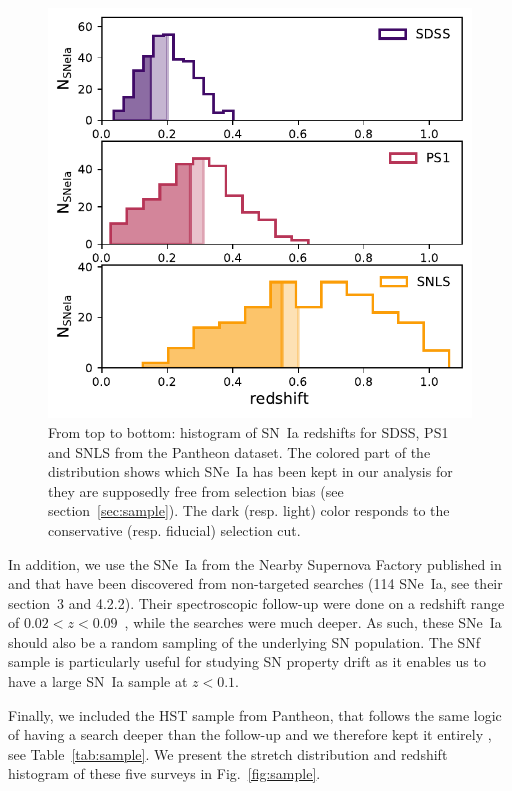 \documentclass[]{aa} %
\newcommand{\nn}[1]{{\textcolor[rgb]{1, 0.27, 0}{#1}}}
\begin{document}
\begin{figure}
    \centering
    \includegraphics[width=0.95\linewidth]{Article_figures/hist_surveys_cuts_55-inferno.pdf}
    \caption{From top to bottom: histogram of SN~Ia redshifts for SDSS, PS1 and
    SNLS from the Pantheon dataset. The colored part of the
distribution shows which SNe~Ia has been kept in our analysis for they are
supposedly free from selection bias (see section~\ref{sec:sample}). The
dark (resp. light) color responds to the conservative (resp. fiducial) selection cut.}
    \label{fig:cuts}
\end{figure}

In addition, we use the SNe~Ia from the Nearby Supernova Factory
\citep[SNfactory][]{aldering2004} published in \cite{rigault2018} and that have
been discovered from non-targeted searches (114 SNe~Ia, see their section~3 and
4.2.2). \nn{Their spectroscopic follow-up were done on a redshift range of
$0.02<z<0.09$~\citep[as in ][]{rigault2018}, while the searches were much
deeper. As such, these SNe~Ia} should also be a random sampling of the underlying
SN population. The SNf sample is particularly useful for studying SN property
drift as it enables us to have a large SN~Ia sample at $z<0.1$.  

\nn{Finally, we included t}he HST sample
from Pantheon\nn{, that} follows the same logic of having a search deeper than the
follow-up and we therefore kept it entirely \citep{strolger04}, see
Table~\ref{tab:sample}. \nn{We present the stretch distribution and redshift histogram of these five surveys in Fig.~\ref{fig:sample}}.
\end{document}
